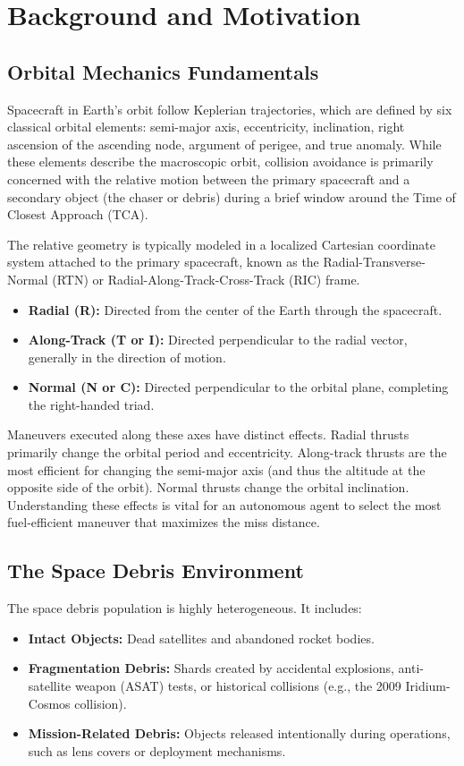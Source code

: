 \documentclass[10pt,journal,compsoc]{IEEEtran}
\begin{document}
\section{Background and Motivation}

\subsection{Orbital Mechanics Fundamentals}
Spacecraft in Earth's orbit follow Keplerian trajectories, which are defined by six classical orbital elements: semi-major axis, eccentricity, inclination, right ascension of the ascending node, argument of perigee, and true anomaly. While these elements describe the macroscopic orbit, collision avoidance is primarily concerned with the relative motion between the primary spacecraft and a secondary object (the chaser or debris) during a brief window around the Time of Closest Approach (TCA).

The relative geometry is typically modeled in a localized Cartesian coordinate system attached to the primary spacecraft, known as the Radial-Transverse-Normal (RTN) or Radial-Along-Track-Cross-Track (RIC) frame. 
\begin{itemize}
    \item \textbf{Radial (R):} Directed from the center of the Earth through the spacecraft.
    \item \textbf{Along-Track (T or I):} Directed perpendicular to the radial vector, generally in the direction of motion.
    \item \textbf{Normal (N or C):} Directed perpendicular to the orbital plane, completing the right-handed triad.
\end{itemize}

Maneuvers executed along these axes have distinct effects. Radial thrusts primarily change the orbital period and eccentricity. Along-track thrusts are the most efficient for changing the semi-major axis (and thus the altitude at the opposite side of the orbit). Normal thrusts change the orbital inclination. Understanding these effects is vital for an autonomous agent to select the most fuel-efficient maneuver that maximizes the miss distance.

\subsection{The Space Debris Environment}
The space debris population is highly heterogeneous. It includes:
\begin{itemize}
    \item \textbf{Intact Objects:} Dead satellites and abandoned rocket bodies.
    \item \textbf{Fragmentation Debris:} Shards created by accidental explosions, anti-satellite weapon (ASAT) tests, or historical collisions (e.g., the 2009 Iridium-Cosmos collision).
    \item \textbf{Mission-Related Debris:} Objects released intentionally during operations, such as lens covers or deployment mechanisms.
\end{itemize}
\end{document}

